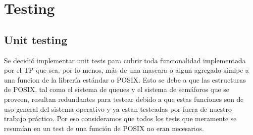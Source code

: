 \documentclass[10pt,a4paper]{report}
\begin{document}
\chapter{Testing}
\section{Unit testing}
Se decidió implementar unit tests para cubrir toda funcionalidad implementada por el TP que sea, por lo menos, más de una mascara o algun agregado simlpe a una funcion de la librería estándar o POSIX. 
Esto se debe a que las estructuras de POSIX, tal como el sistema de queues y el sistema de semáforos que se proveen, resultan redundantes para testear debido a que estas funciones son de uso general del sistema operativo y ya estan testeadas por fuera de nuestro trabajo práctico. Por eso consideramos que todos los tests que meramente se resumían en un test de una función de POSIX no eran necesarios.
\end{document}
